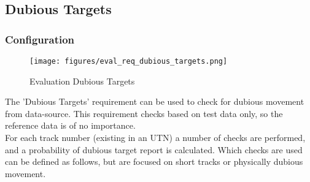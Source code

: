 \subsection{Dubious Targets}
\label{sec:eval_req_dubious_targets} 

\subsubsection{Configuration}

\begin{figure}[H]
    \texttt{[image: figures/eval\_req\_dubious\_targets.png]}
   \caption{Evaluation Dubious Targets}
\end{figure}

The 'Dubious Targets' requirement can be used to check for dubious movement from data-source. This requirement checks based on test data only, so the reference data is of no importance. \\

For each track number (existing in an UTN) a number of checks are performed, and a probability of dubious target report is calculated. Which checks are used can be defined as follows, but are focused on short tracks or physically dubious movement. \\


